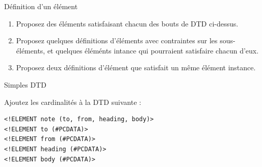 \begin{frame}{Définition d'un élément}
\begin{itemize}

\pagebreak

\begin{minipage}{0.9\textwidth}
\begin{exoblock}%
\begin{enumerate}
\item Proposez des éléments satisfaisant chacun des bouts de DTD ci-dessus.
\item Proposez quelques définitions d'éléments avec contraintes sur les sous-éléments, et quelques éléménts intance qui pourraient satisfaire chacun d'eux.
\item Proposez deux définitions d'élément que satisfait un même élément instance.
\end{enumerate}
\end{exoblock}
\end{minipage}

\end{itemize}


\end{frame}


\begin{frame}[containsverbatim]{Simples DTD}

\begin{exoblock}%
Ajoutez les cardinalités à la DTD suivante :
\begin{lstlisting}
<!ELEMENT note (to, from, heading, body)>
<!ELEMENT to (#PCDATA)>
<!ELEMENT from (#PCDATA)>
<!ELEMENT heading (#PCDATA)>
<!ELEMENT body (#PCDATA)>
\end{lstlisting}
\end{exoblock}

\end{frame}



